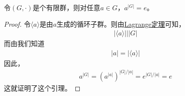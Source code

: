 \documentclass[../../main.tex]{subfiles}
\begin{document}
\begin{lemma}\label{lemma:有限群关于元素阶次方的引理}
令$(G, \cdot)$是个有限群，则对任意$a \in G$，$a^{|G|} = e$。
\end{lemma}
\begin{proof}
令$\langle a \rangle$是由$a$生成的循环子群。则由\hyperref[theorem:Lagrange定理]{Lagrange定理}可知，
\begin{align*}
|\langle a \rangle| \Big| |G|
\end{align*}
而由我们知道
\begin{align*}
|a| = |\langle a \rangle|
\end{align*}
因此，
\begin{align*}
a^{|G|} = \left(a^{|a|}\right)^{|G|/|a|} = e^{|G|/|a|} = e
\end{align*}
这就证明了这个引理。

\end{proof}
\end{document}
